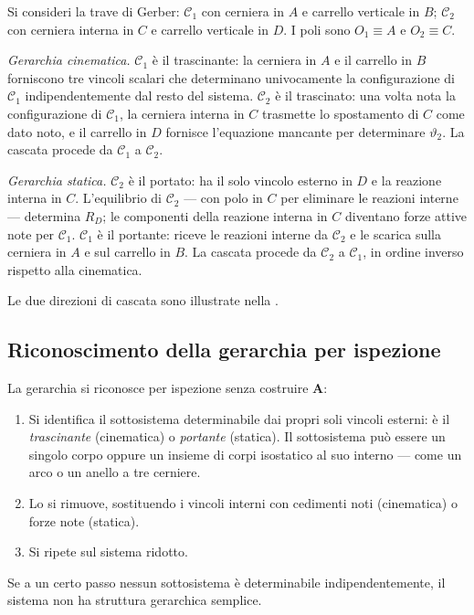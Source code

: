 \begin{esempio}
	\label{ex:gerber_gerarchia}
	Si consideri la trave di Gerber: $\mathcal{C}_1$
	con cerniera in $A$ e carrello verticale in $B$;
	$\mathcal{C}_2$ con cerniera interna in $C$ e
	carrello verticale in $D$. I poli sono
	$O_1 \equiv A$ e $O_2 \equiv C$.
	
	\smallskip
	\noindent\textit{Gerarchia cinematica.}
	$\mathcal{C}_1$ è il trascinante: la cerniera
	in $A$ e il carrello in $B$ forniscono tre
	vincoli scalari che determinano univocamente
	la configurazione di $\mathcal{C}_1$
	indipendentemente dal resto del sistema.
	$\mathcal{C}_2$ è il trascinato: una volta nota
	la configurazione di $\mathcal{C}_1$, la
	cerniera interna in $C$ trasmette lo spostamento
	di $C$ come dato noto, e il carrello in $D$
	fornisce l'equazione mancante per determinare
	$\vartheta_2$. La cascata procede da
	$\mathcal{C}_1$ a $\mathcal{C}_2$.
	
	\smallskip
	\noindent\textit{Gerarchia statica.}
	$\mathcal{C}_2$ è il portato: ha il solo
	vincolo esterno in $D$ e la reazione interna
	in $C$. L'equilibrio di $\mathcal{C}_2$ ---
	con polo in $C$ per eliminare le reazioni
	interne --- determina $R_D$; le componenti
	della reazione interna in $C$ diventano
	forze attive note per $\mathcal{C}_1$.
	$\mathcal{C}_1$ è il portante: riceve le
	reazioni interne da $\mathcal{C}_2$ e le
	scarica sulla cerniera in $A$ e sul carrello
	in $B$. La cascata procede da $\mathcal{C}_2$
	a $\mathcal{C}_1$, in ordine inverso rispetto
	alla cinematica.
	
	Le due direzioni di cascata sono illustrate
	nella .
	



\end{esempio}


\subsection{Riconoscimento della gerarchia per ispezione}
\label{sec:riconoscimento_gerarchia}


La gerarchia si riconosce per ispezione senza costruire $\bm{A}$:
\begin{enumerate}[label=(\arabic*), leftmargin=*, itemsep=3pt]
	\item Si identifica il sottosistema determinabile dai propri
	soli vincoli esterni: è il \emph{trascinante} (cinematica) o
	\emph{portante} (statica). Il sottosistema può essere un singolo
	corpo oppure un insieme di corpi isostatico al suo interno ---
	come un arco o un anello a tre cerniere.
	\item Lo si rimuove, sostituendo i vincoli interni con cedimenti
	noti (cinematica) o forze note (statica).
	\item Si ripete sul sistema ridotto.
\end{enumerate}
Se a un certo passo nessun sottosistema è determinabile
indipendentemente, il sistema non ha struttura gerarchica semplice.



